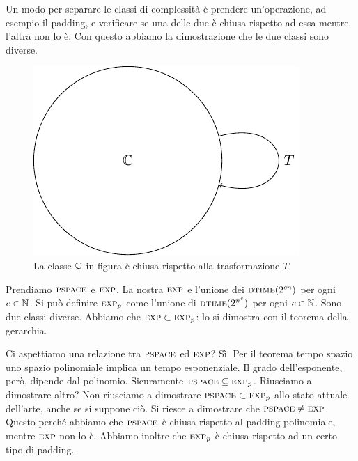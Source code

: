Un modo per separare le classi di complessità è prendere un'operazione, ad esempio il padding, e
verificare se una delle due è chiusa rispetto ad essa mentre l'altra non lo è. Con questo abbiamo
la dimostrazione che le due classi sono diverse.

\begin{figure}[h]
    \begin{center}
        \includegraphics{./img/timespacehierarchies/ClosedClass.pdf}    
        \caption{La classe $\mathbb{C}$ in figura è chiusa rispetto alla trasformazione $T$}
    \end{center}
\end{figure}

Prendiamo $\textsc{pspace}$ e $\textsc{exp}$. La nostra $\textsc{exp}$ e l'unione dei $\textsc{dtime}(2^{cn})$ per ogni $c \in
\mathbb{N}$. Si può definire $\textsc{exp}_{p}$ come l'unione di $\textsc{dtime}(2^{n^{c}})$ per ogni $c \in \mathbb{N}$. Sono
due classi diverse. Abbiamo che $\textsc{exp} \subset \textsc{exp}_{p}$: lo si dimostra con il teorema della
gerarchia.

Ci aspettiamo una relazione tra $\textsc{pspace}$ ed $\textsc{exp}$? Sì. Per il teorema tempo spazio uno spazio
polinomiale implica un tempo esponenziale. Il grado dell'esponente, però, dipende dal polinomio.
Sicuramente $\textsc{pspace} \subseteq \textsc{exp}_{p}$. Riusciamo a dimostrare altro? Non riusciamo a dimostrare
$\textsc{pspace} \subset \textsc{exp}_{p}$ allo stato attuale dell'arte, anche se si suppone ciò. Si riesce a
dimostrare che $\textsc{pspace} \not= \textsc{exp}$. Questo perché abbiamo che $\textsc{pspace}$ è chiusa rispetto al
padding polinomiale, mentre $\textsc{exp}$ non lo è. Abbiamo inoltre che $\textsc{exp}_{p}$ è chiusa
rispetto ad un certo tipo di padding.

